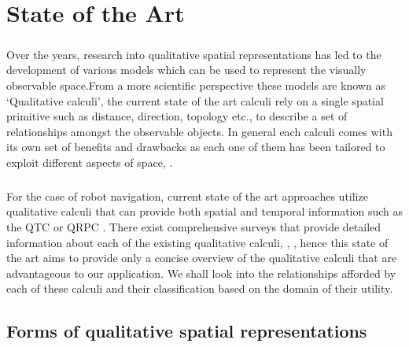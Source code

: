 
\chapter{State of the Art}
\paragraph{}Over the years, research into qualitative spatial representations has led to the development of various models which can be used to represent the visually observable space.From a more scientific perspective these models are known as `Qualitative calculi', the current state of the art calculi rely on a single spatial primitive such as distance, direction, topology etc., to describe a set of relationships amongst the observable objects. In general each calculi comes with its own set of benefits and drawbacks as each one of them has been tailored to exploit different aspects of space\cite{chen2015survey}, \cite{cohn2008qualitative}. 

\paragraph{}For the case of robot navigation, current state of the art approaches utilize qualitative calculi that can provide both spatial and temporal information such as the QTC \cite{van2005qualitative} or QRPC \cite{glez2013qrpc}. There exist comprehensive surveys that provide detailed information about each of the existing qualitative calculi\cite{cohn1997qualitative}, \cite{chen2015survey}, \cite{cohn2001qualitative}, \cite{cohn2008qualitative} hence this state of the art aims to provide only a concise overview of the qualitative calculi that are advantageous to our application. We shall look into the relationships afforded by each of these calculi and their classification based on the domain of their utility.

 
\section{Forms of qualitative spatial representations}
		
